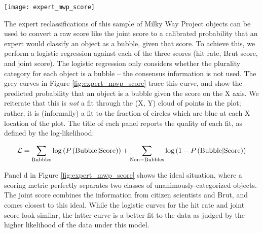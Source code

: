 \documentclass[preprint]{aastex}
\begin{document}
\begin{figure*}
\texttt{[image: expert\_mwp\_score]}
\caption{The ability for the MWP hit rate and Brut score to predict expert expert classifications for objects in the MWP catalog. Each circle represents an object in the MWP catalog. Color depicts the most popular classification, and the y-position indicates the fraction of experts who chose this category. The curves estimate the bubble probability (right Y axis), obtained via logistic regression to the object category. The Joint metric, which combines the Hit Rate and Brut score, is best able to predict expert classifications. The title reports the log-likelihood of each logistic fit, according to Equation \ref{eq:likelihood}. Panel d depicts the ideal situation, where classes are unambiguous.}
\label{fig:expert_mwp_score}
\end{figure*}

The expert reclassifications of this sample of Milky Way Project objects can be used to convert a raw score like the joint score to a calibrated probability that an expert would classify an object as a bubble, given that score. To achieve this, we perform a logistic regression against each of the three scores (hit rate, Brut score, and joint score). The logistic regression only considers whether the plurality category for each object is a bubble -- the consensus information is not used. The grey curves in Figure \ref{fig:expert_mwp_score} trace this curve, and show the predicted probability that an object is a bubble given the score on the X axis. We reiterate that this is \emph{not} a fit through the (X, Y) cloud of points in the plot; rather, it is (informally) a fit to the fraction of circles which are blue at each X location of the plot. The title of each panel reports the quality of each fit, as defined by the log-likelihood:

\begin{equation}
\mathcal{L} = \sum_{\rm Bubbles} \log\left(P\left({\rm Bubble | Score}\right)\right) + \sum_{\rm Non-Bubbles} \log\left(1 - P\left({\rm Bubble | Score}\right)\right)
\label{eq:likelihood}
\end{equation}

Panel d in Figure \ref{fig:expert_mwp_score} shows the ideal situation, where a scoring metric perfectly separates two classes of unanimously-categorized objects. The joint score combines the information from citizen scientists and Brut, and comes closest to this ideal. While the logistic curves for the hit rate and joint score look similar, the latter curve is a better fit to the data as judged by the higher likelihood of the data under this model.
\end{document}
